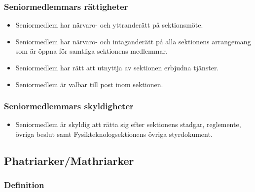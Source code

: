 \documentclass[11pt,a4paper]{article}
\begin{document}
\subsubsection{Seniormedlemmars rättigheter}

\begin{itemize}

   \item Seniormedlem har närvaro- och yttranderätt på sektionsmöte.

   \item Seniormedlem har närvaro- och intaganderätt på alla
   sektionens arrangemang som är öppna för samtliga sektionens
   medlemmar.

   \item Seniormedlem har rätt att utnyttja av sektionen erbjudna
   tjänster.
   
   \item Seniormedlem är valbar till post inom sektionen.

\end{itemize}

\subsubsection{Seniormedlemmars skyldigheter}

\begin{itemize}


\item Seniormedlem är skyldig att rätta sig efter sektionens stadgar,
   regle\-mente, övriga beslut samt  Fysikteknologsektionens övriga styrdokument.
\end{itemize}





\subsection{Phatriarker/Mathriarker}

\subsubsection{Definition}
\end{document}
